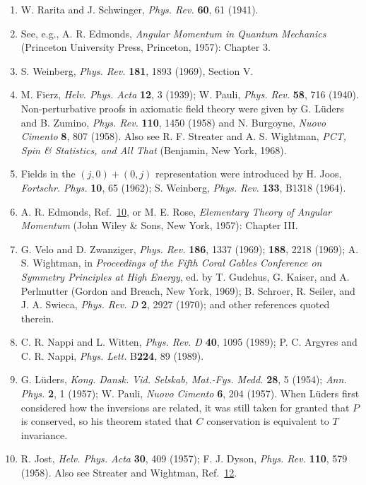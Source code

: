 \begin{enumerate}
\item\label{ref:5.9} W. Rarita and J. Schwinger, \emph{Phys. Rev.} \textbf{60}, 61 (1941).

\item\label{ref:5.10} See, e.g., A. R. Edmonds, \emph{Angular Momentum in Quantum Mechanics}
(Princeton University Press, Princeton, 1957): Chapter 3.

\item\label{ref:5.11} S. Weinberg, \emph{Phys. Rev.} \textbf{181}, 1893 (1969), Section V.

\item\label{ref:5.12} M. Fierz, \emph{Helv. Phys. Acta} \textbf{12}, 3 (1939); W. Pauli,
\emph{Phys. Rev.} \textbf{58}, 716 (1940). Non-perturbative proofs in
axiomatic field theory were given by G. Lüders and B. Zumino,
\emph{Phys. Rev.} \textbf{110}, 1450 (1958) and N. Burgoyne,
\emph{Nuovo Cimento} \textbf{8}, 807 (1958). Also see R. F. Streater and
A. S. Wightman, \emph{PCT, Spin \& Statistics, and All That} (Benjamin,
New York, 1968).

\item\label{ref:5.13} Fields in the $(j,0)+(0,j)$ representation were introduced by H. Joos,
\emph{Fortschr. Phys.} \textbf{10}, 65 (1962); S. Weinberg,
\emph{Phys. Rev.} \textbf{133}, B1318 (1964).

\item\label{ref:5.14} A. R. Edmonds, Ref.~\hyperref[ref:5.10]{10}, or M. E. Rose, \emph{Elementary Theory of
Angular Momentum} (John Wiley \& Sons, New York, 1957): Chapter III.

\item\label{ref:5.15} G. Velo and D. Zwanziger, \emph{Phys. Rev.} \textbf{186}, 1337 (1969);
\textbf{188}, 2218 (1969); A. S. Wightman, in \emph{Proceedings of the Fifth
Coral Gables Conference on Symmetry Principles at High Energy}, ed. by
T. Gudehus, G. Kaiser, and A. Perlmutter (Gordon and Breach, New York,
1969); B. Schroer, R. Seiler, and J. A. Swieca, \emph{Phys. Rev. D}
\textbf{2}, 2927 (1970); and other references quoted therein.

\item\label{ref:5.16} C. R. Nappi and L. Witten, \emph{Phys. Rev. D} \textbf{40}, 1095
(1989); P. C. Argyres and C. R. Nappi, \emph{Phys. Lett.} B\textbf{224}, 89
(1989).

\item\label{ref:5.17} G. Lüders, \emph{Kong. Dansk. Vid. Selskab, Mat.-Fys. Medd.}
\textbf{28}, 5 (1954); \emph{Ann. Phys.} \textbf{2}, 1 (1957); W. Pauli,
\emph{Nuovo Cimento} \textbf{6}, 204 (1957). When Lüders first considered
how the inversions are related, it was still taken for granted that $P$ is
conserved, so his theorem stated that $C$ conservation is equivalent to $T$
invariance.

\item\label{ref:5.18} R. Jost, \emph{Helv. Phys. Acta} \textbf{30}, 409 (1957); F. J. Dyson,
\emph{Phys. Rev.} \textbf{110}, 579 (1958). Also see Streater and Wightman,
Ref.~\hyperref[ref:5.12]{12}.
\end{enumerate}
